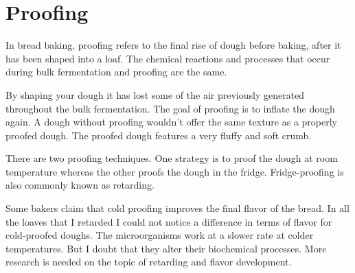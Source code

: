 \section{Proofing}

In bread baking, proofing refers to the final rise of dough before baking,
after it has been shaped into a loaf. The chemical reactions and processes
that occur during bulk fermentation and proofing are the same.

By shaping your dough it has lost some of the air previously generated
throughout the bulk fermentation. The goal of proofing is to inflate
the dough again. A dough without proofing wouldn't offer the same texture
as a properly proofed dough. The proofed dough features a very fluffy
and soft crumb.

There are two proofing techniques. One strategy is to proof the dough
at room temperature whereas the other proofs the dough in the fridge.
Fridge-proofing is also commonly known as retarding.

Some bakers claim that cold proofing improves the final flavor of the bread.
In all the loaves that I retarded I could not notice a difference
in terms of flavor for cold-proofed doughs. The microorganisms work
at a slower rate at colder temperatures. But I doubt that they alter
their biochemical processes. More research is needed on the topic
of retarding and flavor development.



